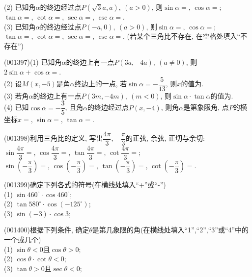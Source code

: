 (2) 已知角$\alpha$的终边经过点$P(\sqrt{3}a,a), \ (a>0)$, 则$\sin\alpha=$, $\cos\alpha=$;\\
$\tan\alpha=$, $\cot\alpha=$, $\sec\alpha=$, $\csc\alpha=$.\\ 
(3) 已知角$\alpha$的终边经过点$P(-a,0), \ (a>0)$, 则$\sin\alpha=$, $\cos\alpha=$;\\
$\tan\alpha=$, $\cot\alpha=$, $\sec\alpha=$, $\csc\alpha=$. (若某个三角比不存在, 在空格处填入``不存在'')
\item (001397)(1) 已知角$\alpha$的终边上有一点$P(3a,-4a), \ (a\ne 0)$, 则$2\sin\alpha+\cos\alpha=$.\\ 
(2) 设$M(x,-5)$是角$\alpha$终边上的一点, 若$\sin\alpha=-\dfrac{5}{13}$, 则$x$的值为.\\ 
(3) 若角$\alpha$的终边上有一点$P(3m,-4m), \ (m<0)$, 则$\sin\alpha\cdot\tan\alpha$的值为.\\ 
(4) 已知$\cos\alpha=-\dfrac{3}{5}$, 且角$\alpha$的终边经过点$P(x,-4)$, 则角$\alpha$是第象限角, 点$P$的横坐标$x=$, $\sin\alpha=$, $\tan\alpha=$.
\item (001398)利用三角比的定义, 写出$\dfrac{4\pi}{3}$, $-\dfrac{\pi}{3}$的正弦, 余弦, 正切与余切:\\ 
$\sin\dfrac{4\pi}{3}=$, $\cos\dfrac{4\pi}{3}=$,
$\tan\dfrac{4\pi}{3}=$, $\cot\dfrac{4\pi}{3}=$;\\ 
$\sin\left(-\dfrac{\pi}{3}\right)=$, $\cos\left(-\dfrac{\pi}{3}\right)=$,
$\tan\left(-\dfrac{\pi}{3}\right)=$, $\cot\left(-\dfrac{\pi}{3}\right)=$.
\item (001399)确定下列各式的符号(在横线处填入``+''或``-'')\\ 
(1) $\sin 460^\circ\cdot\cos 460^\circ$; \\ 
(2) $\tan 580^\circ\cdot \cos(-125^\circ)$; \\ 
(3) $\sin (-3)\cdot \cos 3$; 
\item (001400)根据下列条件, 确定$\theta$是第几象限的角(在横线处填入``1'',``2'',``3''或``4''中的一个或几个)\\ 
(1) $\sin\theta<0$且$\cos\theta>0$; \\ 
(2) $\cos\theta\cdot\cot\theta<0$; \\ 
(3) $\tan\theta>0$且$\sec\theta<0$; \\ 
